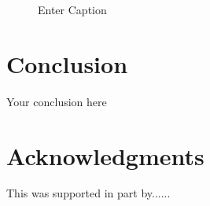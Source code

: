 \documentclass{article}
\begin{document}
\begin{figure}
\begin{subfigure}{.33\textwidth}
    \end{subfigure}
    \caption{Enter Caption}
    \label{fig:disk_flow}
\end{figure}







 
\section{Conclusion}
Your conclusion here

\section*{Acknowledgments}
This was supported in part by......

  
  
\end{document}
